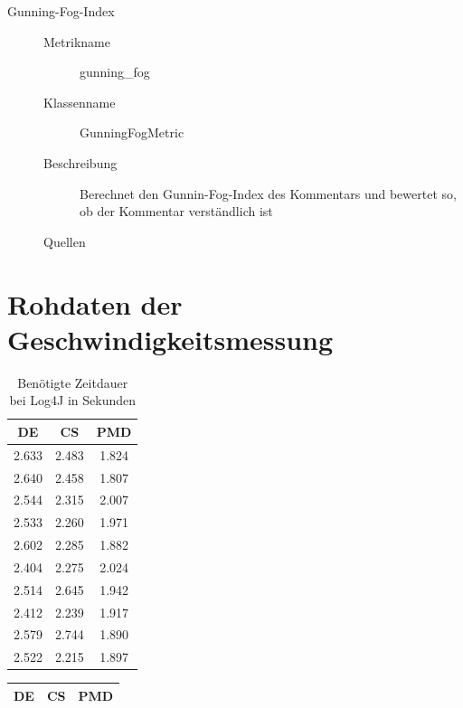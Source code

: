 \begin{appendices}
\begin{description}
\item[Gunning-Fog-Index]
\begin{description}
\item[]
    \item [Metrikname]  gunning\_fog
    \item [Klassenname] GunningFogMetric
    \item[Beschreibung] Berechnet den Gunnin-Fog-Index des Kommentars und bewertet so, ob der Kommentar verständlich ist
     \item[Quellen] \cite[S. 71]{AutomaticQualityAssessmentofSourceCodeComments:TheJavadocMiner}
\end{description}
 \end{description}



\chapter{Rohdaten der Geschwindigkeitsmessung}\label{chapter:raw_speed_data}
\begin{table}[]
    \centering
    \begin{tabular}{c|c|c}
DE & CS &PMD\\\hline
2.633 &	2.483&	1.824\\\hline
		
2.640&	2.458&	1.807\\\hline
		
2.544&	2.315&	2.007\\\hline
		
2.533&	2.260&	1.971\\\hline
		
2.602&	2.285&	1.882\\\hline
		
2.404&	2.275&	2.024\\\hline
		
2.514&	2.645&	1.942\\\hline
		
2.412&	2.239&	1.917\\\hline
		
2.579&	2.744&	1.890\\\hline
		
2.522&	2.215&	1.897\\\hline
  \end{tabular}
    \caption{Benötigte Zeitdauer bei Log4J in Sekunden}
    \label{tab:raw_log4j}
\end{table}


\begin{table}[]
    \centering
    \begin{tabular}{c|c|c}
DE & CS &PMD\\\hline


\end{tabular}
\end{table}
\end{appendices}
